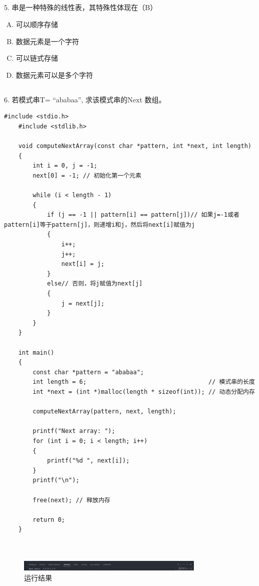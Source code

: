 \documentclass[12pt,hyperref,a4paper,UTF8]{ctexart}
\begin{document}
\subsection{}
5. 串是一种特殊的线性表，其特殊性体现在（B）
\begin{enumerate}[A.]
    \item 可以顺序存储
    \item 数据元素是一个字符
    \item 可以链式存储
    \item 数据元素可以是多个字符
\end{enumerate}

\subsection{}

6. 若模式串T= “ababaa”, 求该模式串的Next 数组。
\begin{lstlisting}[style=CStyle]
    #include <stdio.h>
    #include <stdlib.h> 
    
    void computeNextArray(const char *pattern, int *next, int length)
    {
        int i = 0, j = -1;
        next[0] = -1; // 初始化第一个元素
    
        while (i < length - 1)
        {
            if (j == -1 || pattern[i] == pattern[j])// 如果j=-1或者pattern[i]等于pattern[j]，则递增i和j，然后将next[i]赋值为j
            {
                i++;
                j++;
                next[i] = j;
            }
            else// 否则，将j赋值为next[j]
            {
                j = next[j];
            }
        }
    }
    
    int main()
    {
        const char *pattern = "ababaa";
        int length = 6;                                  // 模式串的长度
        int *next = (int *)malloc(length * sizeof(int)); // 动态分配内存
    
        computeNextArray(pattern, next, length);
    
        printf("Next array: ");
        for (int i = 0; i < length; i++)
        {
            printf("%d ", next[i]);
        }
        printf("\n");
    
        free(next); // 释放内存
    
        return 0;
    }
    
    
\end{lstlisting}
\begin{figure}[H]
    \centering
    \includegraphics[width=0.8\textwidth]{figures/fig1.png}
    \caption{运行结果}
\end{figure}
\end{document}
